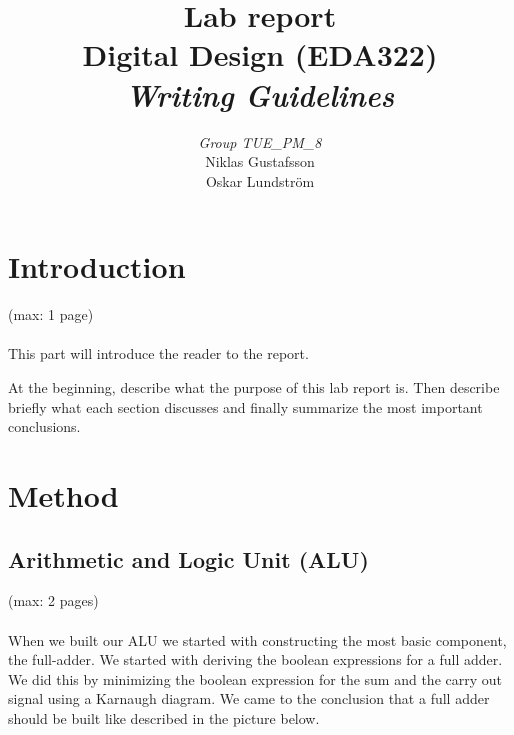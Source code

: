 \documentclass[a4paper,11pt]{article}
\begin{document}
\pagestyle{empty}
\begin{titlepage}

\title{\Huge{Lab report} \\[0.1cm] \Large{Digital Design (EDA322)} \\ [0.4cm] \Large{ \emph{Writing Guidelines}} \\[0.4cm]}
\author{\large{\emph{Group TUE\_PM\_8}} \\[0.2cm] Niklas Gustafsson \\[0.05cm] Oskar Lundström \\[0.1cm]}
\maketitle
\thispagestyle{empty}
\end{titlepage}
\clearpage
\pagestyle{fancyplain}
\tableofcontents
\clearpage
\setcounter{page}{1}
\section{Introduction}
(max: 1 page)
\\\\
This part will introduce the reader to the report. 

At the beginning, describe what the purpose of this lab report is. Then describe briefly what each section discusses and finally summarize the most important conclusions. 

\section{Method}
\subsection{Arithmetic and Logic Unit (ALU)}
(max: 2 pages)
\\\\
When we built our ALU we started with constructing the most basic component, the full-adder. We started with deriving the boolean expressions for a full adder. We did this by minimizing the boolean expression for the sum and the carry out signal using a Karnaugh diagram. We came to the conclusion that a full adder should be built like described in the picture below. 
\end{document}
